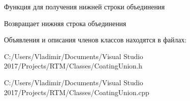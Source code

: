 Функция для получения нижней строки объединения 

\begin{DoxyReturn}{Возвращает}
нижняя строка объединения 
\end{DoxyReturn}


Объявления и описания членов классов находятся в файлах\+:\begin{DoxyCompactItemize}
\item 
C\+:/\+Users/\+Vladimir/\+Documents/\+Visual Studio 2017/\+Projects/\+R\+T\+M/\+Classes/Coating\+Union.\+h\item 
C\+:/\+Users/\+Vladimir/\+Documents/\+Visual Studio 2017/\+Projects/\+R\+T\+M/\+Classes/Coating\+Union.\+cpp\end{DoxyCompactItemize}
